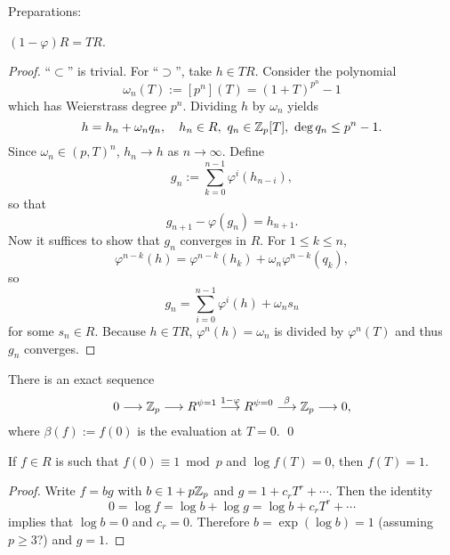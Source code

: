 Preparations:

\begin{lemma}\label{image of 1 - phi = TZ_p[[T]]}
    $(1-\varphi)R = TR$.
\end{lemma}
\begin{proof}
    ``$\subset$'' is trivial.
    For ``$\supset$'', take $h\in TR$.
    Consider the polynomial \[\omega_n(T) := [p^n](T) = (1 + T)^{p^n} - 1\]
    which has Weierstrass degree $p^n$.
    Dividing $h$ by $\omega_n$ yields
    \[h = h_n + \omega_nq_n,
    \quad h_n\in R,\ q_n\in\mathbb{Z}_p[T],\ \deg q_n \le p^n - 1.\]
    Since $\omega_n\in (p, T)^n$,
    $h_n\to h$ as $n\to\infty$.
    Define \[g_n := \sum_{k=0}^{n-1}\varphi^i(h_{n-i}),\]
    so that \[g_{n+1} - \varphi(g_n) = h_{n+1}.\]
    Now it suffices to show that $g_n$ converges in $R$.
    For $1\le k\le n$,
    \[\varphi^{n-k}(h) = \varphi^{n-k}(h_k) + \omega_n \varphi^{n-k}(q_k),\]
    so \[g_n = \sum_{i=0}^{n-1} \varphi^{i}(h) + \omega_n s_n\]
    for some $s_n\in R$.
    Because $h\in TR$,
    $\varphi^n(h) = \omega_n$ is divided by $\varphi^n(T)$ and thus $g_n$ converges.
\end{proof}
\begin{lemma}
    There is an exact sequence
    \[0\longrightarrow\mathbb{Z}_p\longrightarrow R^{\psi = 1}\stackrel{1 - \varphi}{\longrightarrow}R^{\psi = 0}\stackrel{\beta}{\longrightarrow} \mathbb{Z}_p\longrightarrow 0,\]
    where $\beta(f) := f(0)$ is the evaluation at $T = 0$.
    \qed
\end{lemma}

\begin{lemma}\label{lem: constant = 1 mod p and log = 0 imply self = 1}
    If $f\in R$ is such that $f(0)\equiv 1\bmod p$ and $\log f(T) = 0$,
    then $f(T) = 1$.
\end{lemma}
\begin{proof}
    Write $f = bg$ with $b\in 1 + p\mathbb{Z}_p$ and $g = 1 + c_rT^r + \cdots$.
    Then the identity \[0 = \log f = \log b + \log g = \log b + c_rT^r + \cdots\]
    implies that $\log b = 0$ and $c_r = 0$.
    Therefore $b = \exp(\log b) = 1$ (assuming $p\ge 3$?) and $g = 1$.
\end{proof}

